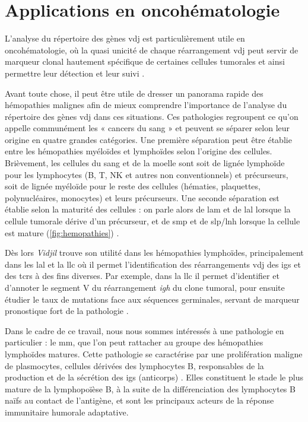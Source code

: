 \section{Applications en oncohématologie}

L'analyse du répertoire des gènes \gls{vdj} est particulièrement utile en
oncohématologie, où la quasi unicité de chaque réarrangement \gls{vdj} peut
servir de marqueur clonal hautement spécifique de certaines cellules tumorales
et ainsi permettre leur détection et leur suivi
\cite{hultcrantzBaselineVDJClonotype2020}.

Avant toute chose, il peut être utile de dresser un panorama rapide des
hémopathies malignes afin de mieux comprendre l'importance de l'analyse du
répertoire des gènes \gls{vdj} dans ces situations. Ces pathologies regroupent
ce qu'on appelle communément les « cancers du sang » et peuvent se séparer
selon leur origine en quatre grandes catégories. Une première séparation peut
être établie entre les hémopathies myéloïdes et lymphoïdes selon l'origine des
cellules. Brièvement, les cellules du sang et de la moelle sont soit de lignée
lymphoïde pour les lymphocytes (B, T, NK et autres non conventionnels) et
précurseurs, soit de lignée myéloïde pour le reste des cellules (hématies,
plaquettes, polynucléaires, monocytes) et leurs précurseurs. Une seconde
séparation est établie selon la maturité des cellules : on parle alors de
\gls{lam} et de \gls{lal} lorsque la cellule tumorale dérive d'un
précurseur, et de \gls{smp} et de \gls{slp}/\gls{lnh} lorsque la cellule
est mature (\autoref{fig:hemopathies}) \cite{alaggio5thEditionWorld2022a,
khoury5thEditionWorld2022}.



Dès lors \textit{Vidjil} trouve son utilité dans les hémopathies lymphoïdes,
principalement dans les \gls{lal} et la \gls{llc} où il permet
l'identification des réarrangements \gls{vdj} des \glspl{ig} et des \glspl{tcr}
à des fins diverses. Par exemple, dans la \gls{llc} il permet d'identifier
et d'annoter le segment V du réarrangement \textit{\gls{igh}} du clone tumoral,
pour ensuite étudier le taux de mutations face aux séquences germinales,
servant de marqueur pronostique fort de la pathologie
\cite{crombieIGHVMutationalStatus2017}.

Dans le cadre de ce travail, nous nous sommes intéressés à une pathologie en
particulier : le \gls{mm}, que l'on peut rattacher au groupe des hémopathies
lymphoïdes matures. Cette pathologie se caractérise par une prolifération
maligne de plasmocytes, cellules dérivées des lymphocytes B, responsables de la
production et de la sécrétion des \glspl{ig} (anticorps)
\cite{briglePathobiologyDiagnosisMultiple2017}. Elles constituent le stade le
plus mature de la lymphopoïèse B, à la suite de la différenciation des
lymphocytes B naïfs au contact de l'antigène, et sont les principaux acteurs de
la réponse immunitaire humorale adaptative.

